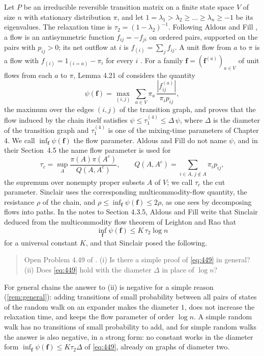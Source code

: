 \documentclass[11pt]{amsart}
\theoremstyle{definition}
\newcommand{\bfF}{\mathbf{f}}
\begin{document}
Let $P$ be an irreducible reversible transition matrix on a finite state space $V$ of size $n$ with stationary distribution $\pi$, and let $1=\lambda_1>\lambda_2\ge\dots\ge\lambda_n\ge-1$ be its eigenvalues. The relaxation time is $\tau_2=(1-\lambda_2)^{-1}$. Following Aldous and Fill \cite[Chapter~3]{AF}, a flow is an antisymmetric function $f_{ij}=-f_{ji}$ on ordered pairs, supported on the pairs with $p_{ij}>0$; its net outflow at $i$ is $f_{(i)}=\sum_jf_{ij}$. A unit flow from $a$ to $\pi$ is a flow with $f_{(i)}=1_{(i=a)}-\pi_i$ for every $i$ \cite[(3.98)]{AF}. For a family $\bfF=(\bfF^{(a)})_{a\in V}$ of unit flows from each $a$ to $\pi$, Lemma 4.21 of \cite{AF} considers the quantity
\begin{equation}\label{eq:psi}
\psi(\bfF)=\max_{(i,j)}\ \sum_{a\in V}\pi_a\,\frac{|f^{(a)}_{ij}|}{\pi_ip_{ij}},
\end{equation}
the maximum over the edges $(i,j)$ of the transition graph, and proves that the flow induced by the chain itself satisfies $\psi\le\tau_1^{(4)}\le\Delta\,\psi$, where $\Delta$ is the diameter of the transition graph and $\tau_1^{(4)}$ is one of the mixing-time parameters of Chapter 4. We call $\inf_{\bfF}\psi(\bfF)$ the flow parameter. Aldous and Fill do not name $\psi$, and in their Section~4.5 the name flow parameter is used for
\[
\tau_c=\sup_A\frac{\pi(A)\pi(A^c)}{Q(A,A^c)},\qquad Q(A,A^c)=\sum_{i\in A,\,j\notin A}\pi_ip_{ij},
\]
the supremum over nonempty proper subsets $A$ of $V$; we call $\tau_c$ the cut parameter. Sinclair \cite{Sinclair} uses the corresponding multicommodity-flow quantity, the resistance $\rho$ of the chain, and $\rho\le\inf_{\bfF}\psi(\bfF)\le2\rho$, as one sees by decomposing flows into paths. In the notes to Section 4.3.5, Aldous and Fill write that Sinclair \cite{Sinclair} deduced from the multicommodity flow theorem of Leighton and Rao \cite{LR} that
\begin{equation}\label{eq:449}
\inf_{\bfF}\psi(\bfF)\le K\,\tau_2\log n
\end{equation}
for a universal constant $K$, and that Sinclair posed the following.

\begin{quote}
Open Problem 4.49 of \cite{AF}. (i) Is there a simple proof of \eqref{eq:449} in general? (ii) Does \eqref{eq:449} hold with the diameter $\Delta$ in place of $\log n$?
\end{quote}

For general chains the answer to (ii) is negative for a simple reason (\cref{rem:general}): adding transitions of small probability between all pairs of states of the random walk on an expander makes the diameter $1$, does not increase the relaxation time, and keeps the flow parameter of order $\log n$. A simple random walk has no transitions of small probability to add, and for simple random walks the answer is also negative, in a strong form: no constant works in the diameter form $\inf_{\bfF}\psi(\bfF)\le K\tau_2\Delta$ of \eqref{eq:449}, already on graphs of diameter two.
\end{document}

